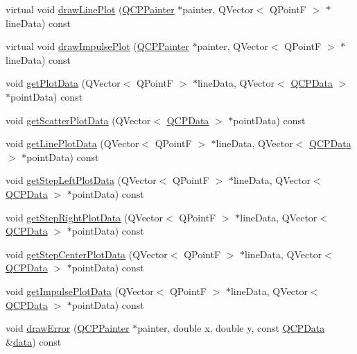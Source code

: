 \begin{DoxyCompactItemize}
\item 
virtual void \hyperlink{class_q_c_p_graph_acebc22c3385829b19a87e6281fe6ade2}{draw\-Line\-Plot} (\hyperlink{class_q_c_p_painter}{Q\-C\-P\-Painter} $\ast$painter, Q\-Vector$<$ Q\-Point\-F $>$ $\ast$line\-Data) const 
\item 
virtual void \hyperlink{class_q_c_p_graph_abc01180629621f1e47e94559227d3d8c}{draw\-Impulse\-Plot} (\hyperlink{class_q_c_p_painter}{Q\-C\-P\-Painter} $\ast$painter, Q\-Vector$<$ Q\-Point\-F $>$ $\ast$line\-Data) const 
\item 
void \hyperlink{class_q_c_p_graph_af66183533a29520be3e74489ad1449cc}{get\-Plot\-Data} (Q\-Vector$<$ Q\-Point\-F $>$ $\ast$line\-Data, Q\-Vector$<$ \hyperlink{class_q_c_p_data}{Q\-C\-P\-Data} $>$ $\ast$point\-Data) const 
\item 
void \hyperlink{class_q_c_p_graph_a0899c4d6357aee19a3abff5897c3c8c5}{get\-Scatter\-Plot\-Data} (Q\-Vector$<$ \hyperlink{class_q_c_p_data}{Q\-C\-P\-Data} $>$ $\ast$point\-Data) const 
\item 
void \hyperlink{class_q_c_p_graph_ac76804eb33446181f3e4f708b7639a75}{get\-Line\-Plot\-Data} (Q\-Vector$<$ Q\-Point\-F $>$ $\ast$line\-Data, Q\-Vector$<$ \hyperlink{class_q_c_p_data}{Q\-C\-P\-Data} $>$ $\ast$point\-Data) const 
\item 
void \hyperlink{class_q_c_p_graph_a6b7c14e04deed69b70d552dbe70c4d28}{get\-Step\-Left\-Plot\-Data} (Q\-Vector$<$ Q\-Point\-F $>$ $\ast$line\-Data, Q\-Vector$<$ \hyperlink{class_q_c_p_data}{Q\-C\-P\-Data} $>$ $\ast$point\-Data) const 
\item 
void \hyperlink{class_q_c_p_graph_ab2ad46716889c73ab977cf9280de0788}{get\-Step\-Right\-Plot\-Data} (Q\-Vector$<$ Q\-Point\-F $>$ $\ast$line\-Data, Q\-Vector$<$ \hyperlink{class_q_c_p_data}{Q\-C\-P\-Data} $>$ $\ast$point\-Data) const 
\item 
void \hyperlink{class_q_c_p_graph_ac79dc75dd98db9948d9656447b463af5}{get\-Step\-Center\-Plot\-Data} (Q\-Vector$<$ Q\-Point\-F $>$ $\ast$line\-Data, Q\-Vector$<$ \hyperlink{class_q_c_p_data}{Q\-C\-P\-Data} $>$ $\ast$point\-Data) const 
\item 
void \hyperlink{class_q_c_p_graph_a0ff6e856387cc079b28592ead2a81f6c}{get\-Impulse\-Plot\-Data} (Q\-Vector$<$ Q\-Point\-F $>$ $\ast$line\-Data, Q\-Vector$<$ \hyperlink{class_q_c_p_data}{Q\-C\-P\-Data} $>$ $\ast$point\-Data) const 
\item 
void \hyperlink{class_q_c_p_graph_a4df6807066ce877705e999773e7ffbc4}{draw\-Error} (\hyperlink{class_q_c_p_painter}{Q\-C\-P\-Painter} $\ast$painter, double x, double y, const \hyperlink{class_q_c_p_data}{Q\-C\-P\-Data} \&\hyperlink{class_q_c_p_graph_a8f4c17d993df4759c7426db45b33fbc0}{data}) const 

\end{DoxyCompactItemize}

